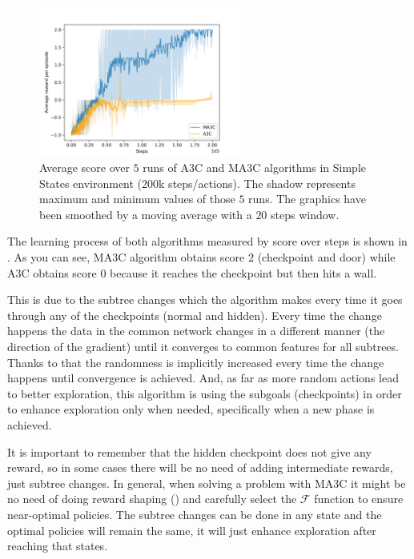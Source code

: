 \begin{figure}[hbtp]
\begin{center}
\includegraphics[width=250]{img/SimpleStates_performance.png}
\end{center}
\caption[Simple States performance]
{Average score over $5$ runs of \ac{A3C} and \ac{MA3C} algorithms in Simple States environment (200k steps/actions).
The shadow represents maximum and minimum values of those $5$ runs.
The graphics have been smoothed by a moving average with a $20$ steps window.}
\label{fig:SimpleStates_performance}
\end{figure}

The learning process of both algorithms measured by score over steps is shown in .
As you can see, \ac{MA3C} algorithm obtains score $2$ (checkpoint and door) while \ac{A3C} obtains score $0$ because it
reaches the checkpoint but then hits a wall.

This is due to the subtree changes which the algorithm makes every time it goes through any of the checkpoints (normal
and hidden).
Every time the change happens the data in the common network changes in a different manner (the direction of the gradient)
until it converges to common features for all subtrees.
Thanks to that the randomness is implicitly increased every time the change happens until convergence is achieved.
And, as far as more random actions lead to better exploration, this algorithm is using the subgoals (checkpoints) in
order to enhance exploration only when needed, specifically when a new phase is achieved.

It is important to remember that the hidden checkpoint does not give any reward, so in some cases there will be no need
of adding intermediate rewards, just subtree changes.
In general, when solving a problem with \ac{MA3C} it might be no need of doing reward shaping ()
and carefully select the $\mathcal{F}$ function to ensure near-optimal policies.
The subtree changes can be done in any state and the optimal policies will remain the same, it will just enhance exploration
after reaching that states.

